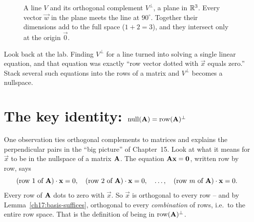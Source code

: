 \begin{figure}[H]
\centering
{}
\caption{A line $V$ and its orthogonal complement $V^{\perp}$, a plane in $\mathbb{R}^3$. Every vector $\vec{w}$
in the plane meets the line at $90^\circ$. Together their dimensions add to the full space
($1+2=3$), and they intersect only at the origin $\vec{0}$.}
\label{ch17:complement-pic}
\end{figure}

Look back at the lab. Finding $V^\perp$ for a line turned into solving a single
linear equation, and that equation was exactly ``row vector dotted with $\vec x$ equals zero.''
Stack several such equations into the rows of a matrix and $V^\perp$ becomes a nullspace.

\section{The key identity: \texorpdfstring{$\operatorname{null}(\mathbf{A})=\operatorname{row}(\mathbf{A})^\perp$}{null A = row A perp}}

One observation ties orthogonal complements to matrices and explains the perpendicular pairs in
the ``big picture'' of Chapter~15. Look at what it means for $\vec{x}$ to be in the nullspace of a matrix
$\mathbf{A}$. The equation $\mathbf{A}\mathbf{x}=\mathbf{0}$, written row by row, says
\[
  (\text{row 1 of }\mathbf{A})\cdot\mathbf{x}=0,\quad
  (\text{row 2 of }\mathbf{A})\cdot\mathbf{x}=0,\quad\dots,\quad
  (\text{row }m\text{ of }\mathbf{A})\cdot\mathbf{x}=0.
\]
Every row of $\mathbf{A}$ dots to zero with $\vec{x}$. So $\vec{x}$ is orthogonal to every row -- and
by Lemma~\ref{ch17:basis-suffices}, orthogonal to every \emph{combination} of rows, i.e.\ to the
entire row space. That is the definition of being in $\operatorname{row}(\mathbf{A})^\perp$.

